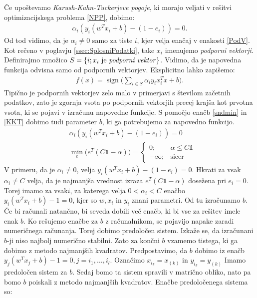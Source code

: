 \documentclass[mat1]{fmfdelo}
\DeclareMathOperator{\sign}{sign}
\begin{document}
Če upoštevamo \emph{Karush-Kuhn-Tuckerjeve pogoje}, ki morajo veljati v rešitvi optimizacijskega problema \eqref{NPP}, dobimo:  %
\begin{align}
\label{KKT}
\alpha_i(y_i(w^Tx_i + b)-(1-e_i)) = 0.
\end{align} 
Od tod vidimo, da je $\alpha_i \ne 0$ samo za tiste $i$, kjer velja enačaj v enakosti \eqref{PodV}. Kot rečeno v poglavju \ref{ssec:SplosniPodatki}, take $x_i$ imenujemo \emph{podporni vektorji}. Definirajmo množico $S = \{i; x_i \text{ je \emph{podporni vektor}}\}$. Vidimo, da je napovedna funkcija odvisna samo od podpornih vektorjev. Eksplicitno lahko zapišemo: 
\begin{align*}
f(x) = \sign\bigg(\sum_{i \in S}\alpha_iy_ix_i^Tx +b\bigg).
\end{align*}
Tipično je podpornih vektorjev zelo malo v primerjavi s številom začetnih podatkov, zato je zgornja vsota po podpornih vektorjih precej krajša kot prvotna vsota, ki se pojavi v izračunu napovedne funkcije. S pomočjo enačb \eqref{sndmin} in \eqref{KKT} dobimo tudi parameter $b$, ki ga potrebujemo za napovedno funkcijo. 
\begin{align*}
&\alpha_i(y_i(w^Tx_i + b)-(1-e_i)) = 0\\
&\min_{e}\bigg(e^T(C\mathds{1}-\alpha)\bigg) = 
\begin{cases}
0; & \alpha \le C\mathds{1}\\
-\infty; & \text{sicer}
\end{cases}
\end{align*} 
V primeru, da je  $\alpha_i \ne 0$, velja $y_i(w^Tx_i + b)-(1-e_i) = 0.$ Hkrati za vsak $\alpha_i \ne C$ velja, da je najmanjša vrednost izraza $e^T(C\mathds{1} - \alpha)$ dosežena pri $e_i=0$. Torej imamo za vsak$i$, za katerega velja $0 < \alpha_i < C$ enačbo $y_i(w^Tx_i + b)- 1 = 0$, kjer so $w, x_i$ in $y_i$ znani parametri. Od tu izračunamo $b$. Če bi računali natančno, bi seveda dobili več enačb, ki bi vse za rešitev imele enak $b$. Ko rešujemo enačbe za $b$ z računalnikom, se pojavijo napake zaradi numeričnega računanja. Torej dobimo predoločen sistem. Izkaže se, da izračunani $b$-ji niso najbolj numerično stabilni. Zato za končni $b$ vzamemo tistega, ki ga dobimo z metodo najmanjših kvadratov. Predpostavimo, da $b$ dobimo iz enačb $y_j(w^Tx_j + b)- 1 = 0, j =i_1,\ldots,i_l$. Označimo $x_{i_k} = x_{(k)}$ in $y_{i_k} = y_{(k)}$ Imamo predoločen sistem za $b$. Sedaj bomo ta sistem spravili v matrično obliko, nato pa bomo $b$ poiskali z metodo najmanjših kvadratov. Enačbe predoločenega sistema so: 
\end{document}
